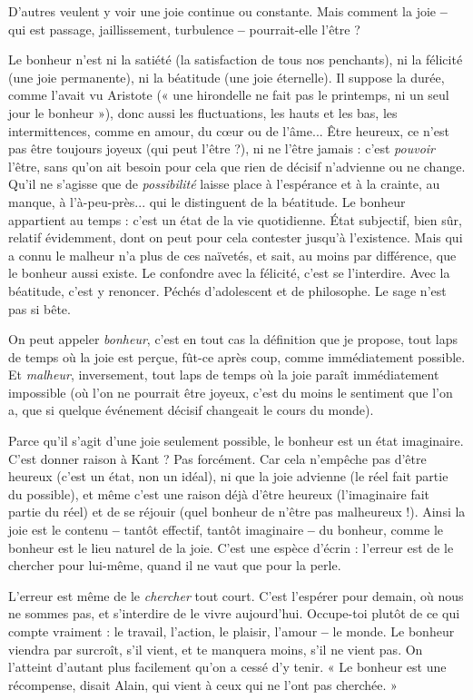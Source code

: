 D’autres veulent y voir une joie continue ou constante. Mais comment la
joie {\bf --} qui est passage, jaillissement, turbulence {\bf --} pourrait-elle l'être ?

Le bonheur n’est ni la satiété (la satisfaction de tous nos penchants), ni la
félicité (une joie permanente), ni la béatitude (une joie éternelle). Il suppose la
durée, comme l’avait vu Aristote (« une hirondelle ne fait pas le printemps, ni
un seul jour le bonheur »), donc aussi les fluctuations, les hauts et les bas, les
intermittences, comme en amour, du cœur ou de l'âme... Être heureux, ce
n'est pas être toujours joyeux (qui peut l'être ?), ni ne l’être jamais : c’est {\it pouvoir}
l'être, sans qu’on ait besoin pour cela que rien de décisif n’advienne ou ne
change. Qu'il ne s'agisse que de {\it possibilité} laisse place à l’espérance et à la
crainte, au manque, à l’à-peu-près... qui le distinguent de la béatitude. Le bonheur
appartient au temps : c’est un état de la vie quotidienne. État subjectif,
bien sûr, relatif évidemment, dont on peut pour cela contester jusqu’à l’existence.
Mais qui a connu le malheur n’a plus de ces naïvetés, et sait, au moins
par différence, que le bonheur aussi existe. Le confondre avec la félicité, c’est se
l’interdire. Avec la béatitude, c’est y renoncer. Péchés d’adolescent et de philosophe.
Le sage n’est pas si bête.

On peut appeler {\it bonheur}, c’est en tout cas la définition que je propose, tout
laps de temps où la joie est perçue, fût-ce après coup, comme immédiatement
possible. Et {\it malheur}, inversement, tout laps de temps où la joie paraît immédiatement
impossible (où l’on ne pourrait être joyeux, c’est du moins le sentiment
que l’on a, que si quelque événement décisif changeait le cours du
monde).

Parce qu’il s’agit d’une joie seulement possible, le bonheur est un état imaginaire.
C’est donner raison à Kant ? Pas forcément. Car cela n’empêche pas
d’être heureux (c’est un état, non un idéal), ni que la joie advienne (le réel fait
partie du possible), et même c’est une raison déjà d’être heureux (l’imaginaire
fait partie du réel) et de se réjouir (quel bonheur de n’être pas malheureux !).
Ainsi la joie est le contenu {\bf --} tantôt effectif, tantôt imaginaire {\bf --} du bonheur,
comme le bonheur est le lieu naturel de la joie. C’est une espèce d’écrin :
l'erreur est de le chercher pour lui-même, quand il ne vaut que pour la perle.

L'erreur est même de le {\it chercher} tout court. C’est l’espérer pour demain,
où nous ne sommes pas, et s’interdire de le vivre aujourd’hui. Occupe-toi
plutôt de ce qui compte vraiment : le travail, l’action, le plaisir, l'amour {\bf --} le
monde. Le bonheur viendra par surcroît, s’il vient, et te manquera moins, s’il
ne vient pas. On l’atteint d’autant plus facilement qu’on a cessé d’y tenir. « Le
bonheur est une récompense, disait Alain, qui vient à ceux qui ne l’ont pas
cherchée. »

